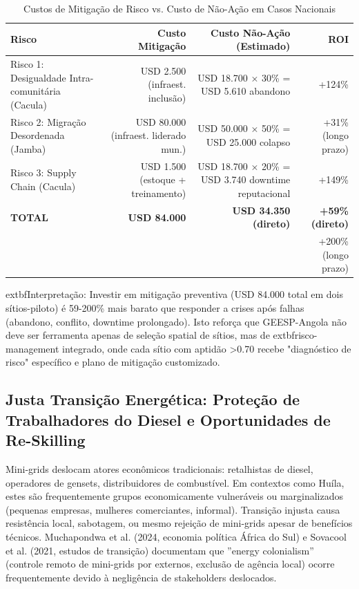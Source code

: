 \documentclass[12pt, a4paper]{article}
\begin{document}
{{{{{{{{{{{{\begin{table}[ht]
\centering
\caption{Custos de Mitigação de Risco vs. Custo de Não-Ação em Casos Nacionais}
\label{tab:mitigation_costs}
\footnotesize
\begin{tabular}{|l|r|r|r|}
\hline
\textbf{Risco} & \textbf{Custo Mitigação} & \textbf{Custo Não-Ação (Estimado)} & \textbf{ROI} \\
\hline
Risco 1: Desigualdade Intra-comunitária (Cacula) & USD 2.500 (infraest. inclusão) & USD 18.700 × 30\% = USD 5.610 abandono & +124\% \\
Risco 2: Migração Desordenada (Jamba) & USD 80.000 (infraest. liderado mun.) & USD 50.000 × 50\% = USD 25.000 colapso & +31\% (longo prazo) \\
Risco 3: Supply Chain (Cacula) & USD 1.500 (estoque + treinamento) & USD 18.700 × 20\% = USD 3.740 downtime reputacional & +149\% \\
\hline
\textbf{TOTAL} & \textbf{USD 84.000} & \textbf{USD 34.350 (direto)} & \textbf{+59\% (direto)} \\
&&  & +200\% (longo prazo) \\
\hline
\end{tabular}
\end{table}

	extbf{Interpretação}: Investir em mitigação preventiva (USD 84.000 total em dois sítios-piloto) é 59-200\% mais barato que responder a crises após falhas (abandono, conflito, downtime prolongado). Isto reforça que GEESP-Angola não deve ser ferramenta apenas de seleção spatial de sítios, mas de 	extbf{risco-management integrado}, onde cada sítio com aptidão >0.70 recebe "diagnóstico de risco" específico e plano de mitigação customizado.

\subsection{Justa Transição Energética: Proteção de Trabalhadores do Diesel e Oportunidades de Re-Skilling}

Mini-grids deslocam atores econômicos tradicionais: retalhistas de diesel, operadores de gensets, distribuidores de combustível. Em contextos como Huíla, estes são frequentemente grupos economicamente vulneráveis ou marginalizados (pequenas empresas, mulheres comerciantes, informal). Transição injusta causa resistência local, sabotagem, ou mesmo rejeição de mini-grids apesar de benefícios técnicos. Muchapondwa et al. (2024, economia política África do Sul) e Sovacool et al. (2021, estudos de transição) documentam que ''energy colonialism'' (controle remoto de mini-grids por externos, exclusão de agência local) ocorre frequentemente devido à negligência de stakeholders deslocados.

}}}}}}}}}}}}
\end{document}
